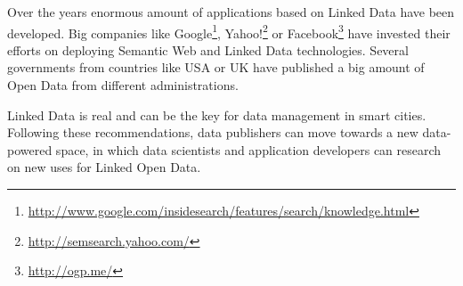 Over the years enormous amount of applications based on Linked Data have been developed. Big companies like Google\footnote{\url{http://www.google.com/insidesearch/features/search/knowledge.html}}, Yahoo!\footnote{\url{http://semsearch.yahoo.com/}} or Facebook\footnote{\url{http://ogp.me/}} have invested their efforts on deploying Semantic Web and Linked Data technologies. Several governments from countries like USA or UK have published a big amount of Open Data from different administrations. 

Linked Data is real and can be the key for data management in smart cities. Following these recommendations, data publishers can move towards a new data-powered space, in which data scientists and application developers can research on new uses for Linked Open Data.